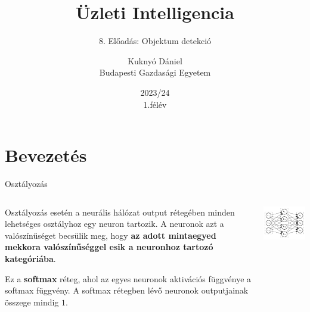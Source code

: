 \documentclass[english, aspectratio=169]{beamer}
\makeatletter
\newcommand\makebeamertitle{\frame{\maketitle}}
\let\origtableofcontents=\tableofcontents
\def\tableofcontents{\@ifnextchar[{\origtableofcontents}{\gobbletableofcontents}}
\def\gobbletableofcontents#1{\origtableofcontents}
\makeatother
\begin{document}
\section{Bevezetés}
\title[]{Üzleti Intelligencia}
\subtitle{8. Előadás: Objektum detekció}
\author[Kuknyó Dániel]{Kuknyó Dániel\\Budapesti Gazdasági Egyetem}
\date{2023/24\\1.félév}
\makebeamertitle

\begin{frame}
\tableofcontents{}
\end{frame}

\begin{frame}
\tableofcontents[currentsection]
\end{frame}

\begin{frame}{Osztályozás}
\begin{columns}
\begin{column}{.5\textwidth}
Osztályozás esetén a neurális hálózat output rétegében minden lehetséges osztályhoz egy neuron tartozik. A neuronok azt a valószínűséget becsülik meg, hogy \textbf{az adott mintaegyed mekkora valószínűséggel esik a neuronhoz tartozó kategóriába}.\par\smallskip
Ez a \textbf{softmax} réteg, ahol az egyes neuronok aktivációs függvénye a softmax függvény. A softmax rétegben lévő neuronok outputjainak összege mindig $1$.
\end{column}
\begin{column}{.5\textwidth}
\begin{center}
\includegraphics[width=7cm, keepaspectratio]{../../7_dl/doc/graphs/dl_1.png}
\end{center}
\end{column}
\end{columns}
\end{frame}
\end{document}
